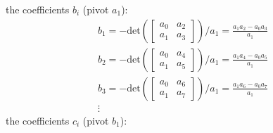\documentclass[twoside]{article}
\begin{document}
the coefficients $b_i$ (pivot $a_1$):
%
\begin{align*}
 b_1 = - \mathrm{det}\left( \left[ \begin{array}{cc} a_0 & a_2 \\ a_1
                                                         &
                                                           a_3 \end{array}
                                                           \right]
                                                           \right) / a_1
=
\frac{a_1 a_2 - a_0 a_3 }{a_1}
\\
b_2 = - \mathrm{det}\left( \left[ \begin{array}{cc} a_0 & a_4 \\ a_1
                                                         &
                                                           a_5 \end{array}
                                                           \right]
                                                           \right) / a_1
=
\frac{a_1 a_4 - a_0 a_5 }{a_1}
\\
b_3 = - \mathrm{det}\left( \left[ \begin{array}{cc} a_0 & a_6 \\ a_1
                                                         &
                                                           a_7 \end{array}
                                                           \right]
                                                           \right) / a_1
=
\frac{a_1 a_6 - a_0 a_7 }{a_1}
\\
\vdots
\end{align*}  
%
the coefficients $c_i$ (pivot $b_1$):
%
%
\end{document}
